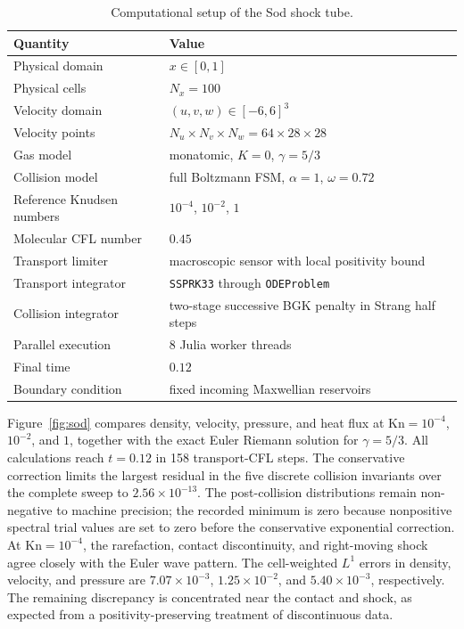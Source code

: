 \documentclass[preprint,3p,12pt]{elsarticle}
\begin{document}
\begin{table}[htbp]
  \centering
  \caption{Computational setup of the Sod shock tube.}
  \label{tab:sod-setup}
  \begin{tabular}{ll}
    \toprule
    Quantity & Value \\
    \midrule
    Physical domain & $x\in[0,1]$ \\
    Physical cells & $N_x=100$ \\
    Velocity domain & $(u,v,w)\in[-6,6]^3$ \\
    Velocity points & $N_u\times N_v\times N_w=64\times28\times28$ \\
    Gas model & monatomic, $K=0$, $\gamma=5/3$ \\
    Collision model & full Boltzmann FSM, $\alpha=1$, $\omega=0.72$ \\
    Reference Knudsen numbers & $10^{-4}$, $10^{-2}$, $1$ \\
    Molecular CFL number & $0.45$ \\
    Transport limiter & macroscopic sensor with local positivity bound \\
    Transport integrator & \texttt{SSPRK33} through \texttt{ODEProblem} \\
    Collision integrator & two-stage successive BGK penalty in Strang half steps \\
    Parallel execution & 8 Julia worker threads \\
    Final time & $0.12$ \\
    Boundary condition & fixed incoming Maxwellian reservoirs \\
    \bottomrule
  \end{tabular}
\end{table}

\FloatBarrier

Figure~\ref{fig:sod} compares density, velocity, pressure, and heat flux at $\mathrm{Kn}=10^{-4}$, $10^{-2}$, and $1$, together with the exact Euler Riemann solution for $\gamma=5/3$. All calculations reach $t=0.12$ in 158 transport-CFL steps. The conservative correction limits the largest residual in the five discrete collision invariants over the complete sweep to $2.56\times10^{-13}$. The post-collision distributions remain non-negative to machine precision; the recorded minimum is zero because nonpositive spectral trial values are set to zero before the conservative exponential correction. At $\mathrm{Kn}=10^{-4}$, the rarefaction, contact discontinuity, and right-moving shock agree closely with the Euler wave pattern. The cell-weighted $L^1$ errors in density, velocity, and pressure are $7.07\times10^{-3}$, $1.25\times10^{-2}$, and $5.40\times10^{-3}$, respectively. The remaining discrepancy is concentrated near the contact and shock, as expected from a positivity-preserving treatment of discontinuous data.
\end{document}
